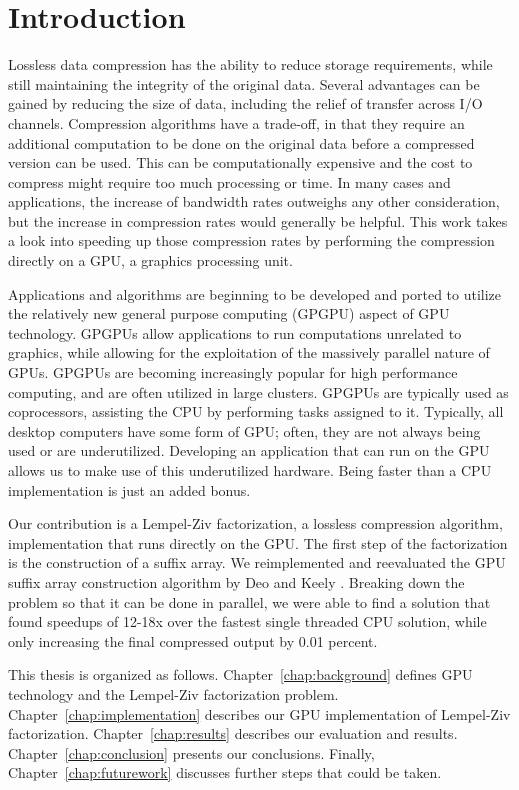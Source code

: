\chapter{Introduction}
Lossless data compression has the ability to reduce storage requirements, while still maintaining the integrity of the original data.
Several advantages can be gained by reducing the size of data, including the relief of transfer across I/O channels.
Compression algorithms have a trade-off, in that they require an additional computation to be done on the original data before a compressed version can be used.
This can be computationally expensive and the cost to compress might require too much processing or time.
In many cases and applications, the increase of bandwidth rates outweighs any other consideration, but the increase in compression rates would generally be helpful.
This work takes a look into speeding up those compression rates by performing the compression directly on a GPU, a graphics processing unit.

Applications and algorithms are beginning to be developed and ported to utilize the relatively new general purpose computing (GPGPU) aspect of GPU technology.
GPGPUs allow applications to run computations unrelated to graphics, while allowing for the exploitation of the massively parallel nature of GPUs.
GPGPUs are becoming increasingly popular for high performance computing, and are often utilized in large clusters.
GPGPUs are typically used as coprocessors, assisting the CPU by performing tasks assigned to it.
Typically, all desktop computers have some form of GPU; often, they are not always being used or are underutilized.
Developing an application that can run on the GPU allows us to make use of this underutilized hardware.
Being faster than a CPU implementation is just an added bonus.


Our contribution is a Lempel-Ziv factorization, a lossless compression algorithm, implementation that runs directly on the GPU.
The first step of the factorization is the construction of a suffix array.
We reimplemented and reevaluated the GPU suffix array construction algorithm by Deo and Keely \cite{Deo}.
Breaking down the problem so that it can be done in parallel, we were able to find a solution that found speedups of 12-18x over the fastest single threaded CPU solution, while only increasing the final compressed output by 0.01 percent.

This thesis is organized as follows.
Chapter~\ref{chap:background} defines GPU technology and the Lempel-Ziv factorization problem.
Chapter~\ref{chap:implementation} describes our GPU implementation of Lempel-Ziv factorization.
Chapter~\ref{chap:results} describes our evaluation and results.
Chapter~\ref{chap:conclusion} presents our conclusions.
Finally, Chapter~\ref{chap:futurework} discusses further steps that could be taken.
